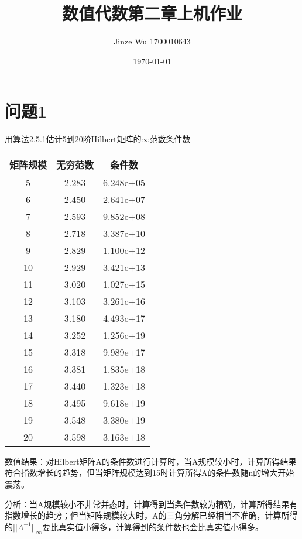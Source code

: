 \documentclass[withoutpreface,bwprint]{cumcmthesis}
\title{数值代数第二章上机作业}
\date{\today}
\author{Jinze Wu 1700010643}
\begin{document}
\maketitle
\section{问题1}

用算法2.5.1估计5到20阶Hilbert矩阵的$\infty$范数条件数

\begin{tabular}{|c|c|c|}
\hline
矩阵规模&无穷范数&条件数\\
\hline
5 &2.283 &6.248e+05\\
6 &2.450 &2.641e+07\\
7 &2.593&9.852e+08\\
8 &2.718&3.387e+10\\
9 &2.829 &1.100e+12\\
10 &2.929&3.421e+13\\
11 &3.020&1.027e+15\\
12 &3.103 &3.261e+16\\
13 &3.180&4.493e+17\\
14 &3.252&1.256e+19\\
15 &3.318&9.989e+17\\
16 &3.381&1.835e+18\\
17 &3.440 &1.323e+18\\
18 &3.495&9.618e+19\\
19 &3.548&3.380e+19\\
20 &3.598&3.163e+18\\
\hline
\end{tabular}

数值结果：对Hilbert矩阵A的条件数进行计算时，当A规模较小时，计算所得结果符合指数增长的趋势，但当矩阵规模达到15时计算所得A的条件数随n的增大开始震荡。

分析：当A规模较小不非常并态时，计算得到当条件数较为精确，计算所得结果有指数增长的趋势；但当矩阵规模较大时，A的三角分解已经相当不准确，计算所得的$\vert \vert A^{-1}\vert \vert_{\infty}$要比真实值小得多，计算得到的条件数也会比真实值小得多。
\end{document}
